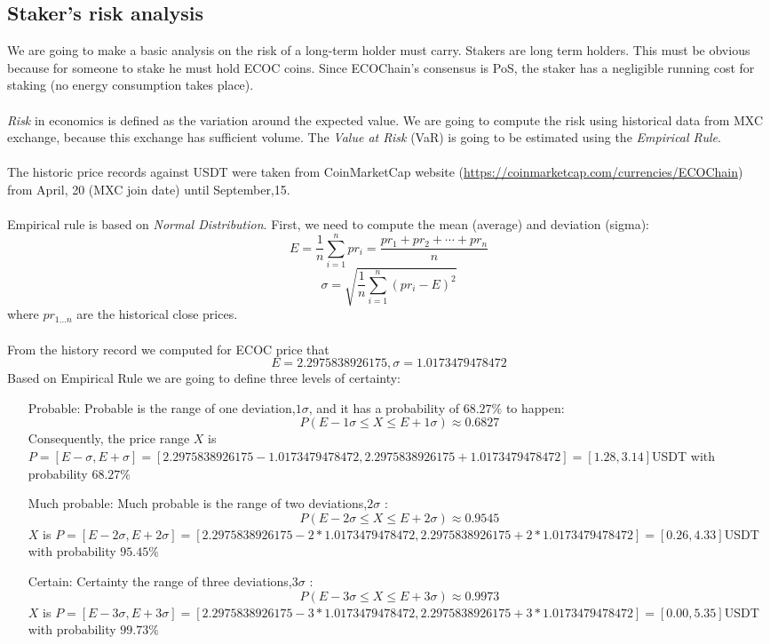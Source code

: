 \documentclass{article}
\begin{document}
\subsection{Staker's risk analysis}
We are going to make a basic analysis on the risk of a long-term holder must carry. Stakers are long term holders. This must be obvious because for someone to stake he must hold ECOC coins. Since ECOChain's consensus is PoS, the staker has a negligible running cost for staking (no energy consumption takes place).
\paragraph{}
\emph{Risk} in economics is defined as the variation around the expected value. We are going to compute the risk using historical data from MXC exchange, because this exchange has sufficient volume. The \emph{Value at Risk} (VaR) is going to be estimated using the \emph{Empirical Rule}.
\paragraph{}
The historic price records against USDT were taken from CoinMarketCap website (\url{https://coinmarketcap.com/currencies/ECOChain}) from April, 20 (MXC join date) until September,15.
\paragraph{}
Empirical rule is based on \emph{Normal Distribution}. First, we need to compute the mean (average) and deviation (sigma):
$${\displaystyle E={\frac {1}{n}}\sum _{i=1}^{n}pr_{i}={\frac {pr_{1}+pr_{2}+\cdots +pr_{n}}{n}}}$$ 
$$\sigma=\sqrt{\frac{1}{n}\sum_{i=1}^{n}(pr_{i}-E)^2}$$
where $pr_{1...n}$ are the historical close prices.
\paragraph{}
From the history record we computed for ECOC price that
$$E=2.2975838926175 , \sigma=1.0173479478472$$
Based on Empirical Rule we are going to define three levels of certainty:
\begin{itemize}
\item[Probable:]
Probable is the range of one deviation,$1\sigma$, and it has a probability of $68.27\%$ to happen:
$$P(E-1\sigma \leq X \leq E+1\sigma) \approx 0.6827 $$
Consequently, the price range $X$ is $P=[E-\sigma,E+\sigma]=[2.2975838926175
-1.0173479478472,2.2975838926175+1.0173479478472]=[1.28,3.14]$USDT with probability $68.27\%$
\item[Much probable:]
Much probable is the range of two deviations,$2\sigma$ :
$$P(E-2\sigma \leq X \leq E+2\sigma) \approx 0.9545 $$
$X$ is $P=[E-2\sigma,E+2\sigma]=[2.2975838926175
-2*1.0173479478472,2.2975838926175+2*1.0173479478472]=[0.26,4.33]$USDT with probability $95.45\%$
\item[Certain:]
Certainty  the range of three deviations,$3\sigma$ :
$$P(E-3\sigma \leq X \leq E+3\sigma) \approx 0.9973 $$
$X$ is $P=[E-3\sigma,E+3\sigma]=[2.2975838926175
-3*1.0173479478472,2.2975838926175+3*1.0173479478472]=[0.00,5.35]$USDT with probability $99.73\%$
\end{itemize}
\end{document}
